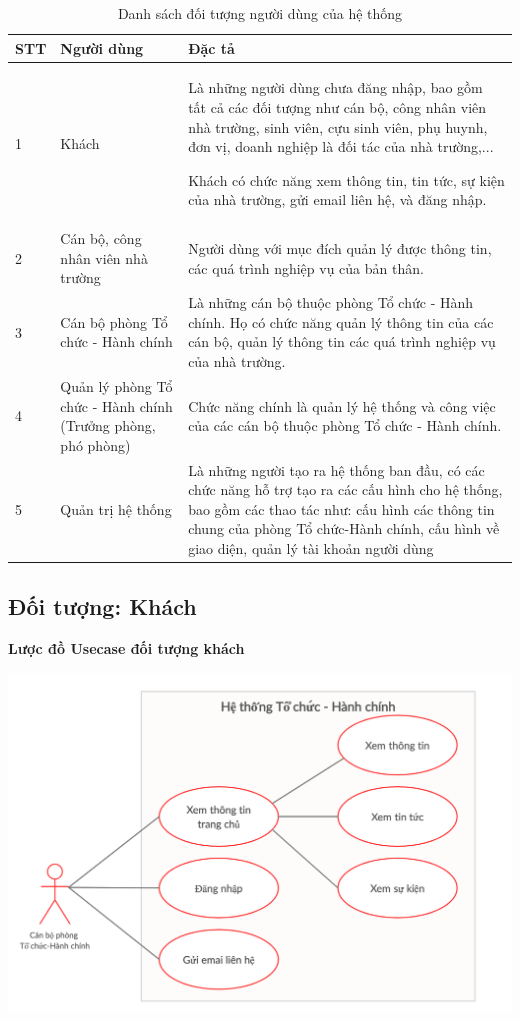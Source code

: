 \begin{table}[H]
    \centering
	\begin{tabular}{|p{1cm}|p{4cm}|p{10cm}|}
    \hline
    \textbf{STT}&\textbf{Người dùng}&\textbf{Đặc tả}\\
    \hline
    1&Khách&Là những người dùng chưa đăng nhập, bao gồm tất cả các đối tượng như cán bộ,  công nhân viên nhà trường, sinh viên, cựu sinh viên, phụ huynh, đơn vị, doanh nghiệp là đối tác của nhà trường,...
    
    Khách có chức năng xem thông tin, tin tức, sự kiện của nhà trường, gửi email liên hệ, và đăng nhập.\\
    \hline
	2&Cán bộ, công nhân viên nhà trường&Người dùng với mục đích quản lý được thông tin, các quá trình nghiệp vụ của bản thân.\\
	\hline
    3&Cán bộ phòng Tổ chức - Hành chính&Là những cán bộ thuộc phòng Tổ chức - Hành chính. Họ có chức năng quản lý thông tin của các cán bộ, quản lý thông tin các quá trình nghiệp vụ của nhà trường.\\
    \hline
    4&Quản lý phòng Tổ chức - Hành chính (Trưởng phòng, phó phòng) &Chức năng chính là quản lý hệ thống và công việc của các cán bộ thuộc phòng Tổ chức - Hành chính. \\
	\hline
    5&Quản trị hệ thống&Là những người tạo ra hệ thống ban đầu, có các chức năng hỗ trợ tạo ra các cấu hình cho hệ thống, bao gồm các thao tác như: cấu hình các thông tin chung của phòng Tổ chức-Hành chính, cấu hình về giao diện, quản lý tài khoản người dùng\\
	\hline
\end{tabular}
\caption{Danh sách đối tượng người dùng của hệ thống}
\end{table}
\subsection{Đối tượng: Khách}
\textbf{Lược đồ Usecase đối tượng khách}
\begin{center}
  \captionsetup{type=figure}
  \includegraphics[width=15cm]{img/usecase/guest.png}
\end{center}

